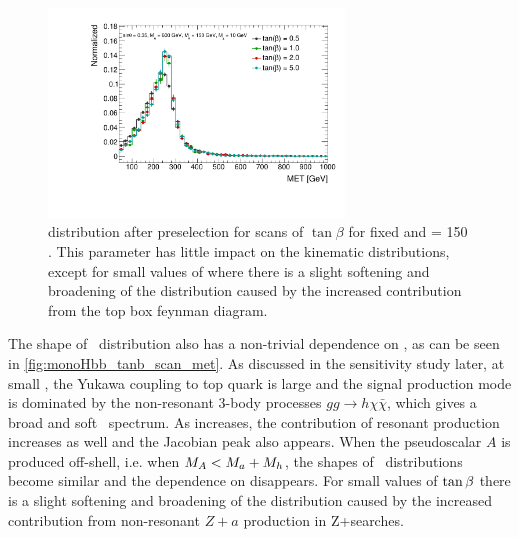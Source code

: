 \begin{figure}
\centering
\includegraphics[width=0.7\textwidth]{texinputs/04_grid/figures/monoz/leptonic/TanbScan_mA600_ma150_MET.pdf} 
\caption{\MET distribution after preselection for scans of $\tan{\beta}$ for fixed  \GeV and \ma = 150 \GeV. 
This parameter has little impact on the kinematic distributions, except for small values of \tanb where there is a slight softening and broadening of the \MET distribution caused by the increased contribution from the top box feynman diagram.}
\label{fig:monoz_kin_tanb}
\end{figure}

The shape of \MET\ distribution also has a non-trivial dependence on \tanb, as can be seen in \autoref{fig:monoHbb_tanb_scan_met}.
As discussed in the sensitivity study later, at small \tanb, the Yukawa coupling to top quark is large and the signal production mode is dominated by the non-resonant 3-body processes $gg\rightarrow h\chi\bar{\chi}$, which gives a broad and soft \MET\ spectrum. 
As \tanb increases, the contribution of resonant production increases as well and the Jacobian peak also appears.
When the pseudoscalar $A$ is produced off-shell, i.e. when $M_{A}<M_{a}+M_{h}$, the shapes of \MET\ distributions become similar and the dependence on \tanb disappears.
For small values of $\tan\beta$ there is a slight softening and broadening of the \MET distribution caused by the increased contribution from non-resonant $Z+a$ production in Z+\MET searches. 

